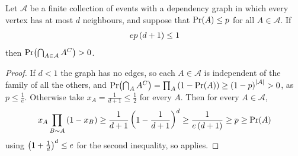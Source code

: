 \begin{boxcorollary} \label{Ch5:Cor:Symmetric_LLL}
    Let $\mathcal{A}$ be a finite collection of events with a dependency graph in which every vertex has at most $d$ neighbours, and suppose that $\Pr\!\left( A \right) \leq p$ for all $A \in \mathcal{A}$. If
    \begin{align*}
        e p \left( d + 1 \right) \leq 1
    \end{align*}
    then $\Pr\!\left( \bigcap_{A \in \mathcal{A}} A^C \right) > 0$.
\end{boxcorollary}
\begin{proof}
    If $d < 1$ the graph has no edges, so each $A \in \mathcal{A}$ is independent of the family of all the others, and $\Pr\!\left( \bigcap_{A} A^C \right) = \prod_{A} \left( 1 - \Pr\!\left( A \right) \right) \geq \left( 1 - p \right)^{\left\lvert \mathcal{A} \right\rvert} > 0$, as $p \leq \frac{1}{e}$. Otherwise take $x_A = \frac{1}{d + 1} \leq \frac{1}{2}$ for every $A$. Then for every $A \in \mathcal{A}$,
    \begin{align*}
        x_A \prod_{B \sim A} \left( 1 - x_B \right) \geq \frac{1}{d + 1} \left( 1 - \frac{1}{d + 1} \right)^{d} \geq \frac{1}{e \left( d + 1 \right)} \geq p \geq \Pr\!\left( A \right)
    \end{align*}
    using $\left( 1 + \frac{1}{d} \right)^d \leq e$ for the second inequality, so  applies.
\end{proof}

